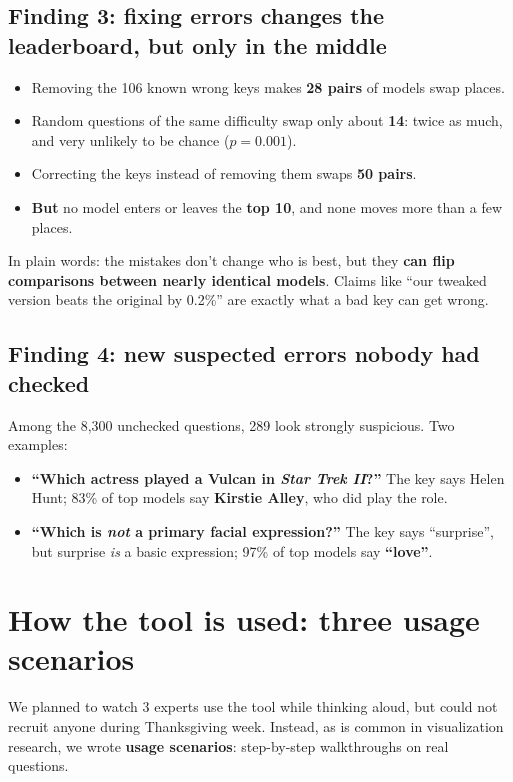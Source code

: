 \documentclass[11pt]{article}
\begin{document}
\subsection*{Finding 3: fixing errors changes the leaderboard, but only in the middle}
\begin{itemize}
  \item Removing the 106 known wrong keys makes \textbf{28 pairs} of models swap places.
  \item Random questions of the same difficulty swap only about \textbf{14}: twice as much, and
    very unlikely to be chance ($p = 0.001$).
  \item Correcting the keys instead of removing them swaps \textbf{50 pairs}.
  \item \textbf{But} no model enters or leaves the \textbf{top 10}, and none moves more than a few places.
\end{itemize}
In plain words: the mistakes don't change who is best, but they \textbf{can flip comparisons between
nearly identical models}. Claims like ``our tweaked version beats the original by 0.2\%'' are exactly
what a bad key can get wrong.

\subsection*{Finding 4: new suspected errors nobody had checked}
Among the 8,300 unchecked questions, 289 look strongly suspicious. Two examples:
\begin{itemize}
  \item \textbf{``Which actress played a Vulcan in \emph{Star Trek II}?''} The key says Helen Hunt;
    83\% of top models say \textbf{Kirstie Alley}, who did play the role.
  \item \textbf{``Which is \emph{not} a primary facial expression?''} The key says ``surprise'', but
    surprise \emph{is} a basic expression; 97\% of top models say \textbf{``love''}.
\end{itemize}

\section{How the tool is used: three usage scenarios}

We planned to watch 3 experts use the tool while thinking aloud, but could not recruit anyone during
Thanksgiving week. Instead, as is common in visualization research, we wrote \textbf{usage
scenarios}: step-by-step walkthroughs on real questions.
\end{document}
